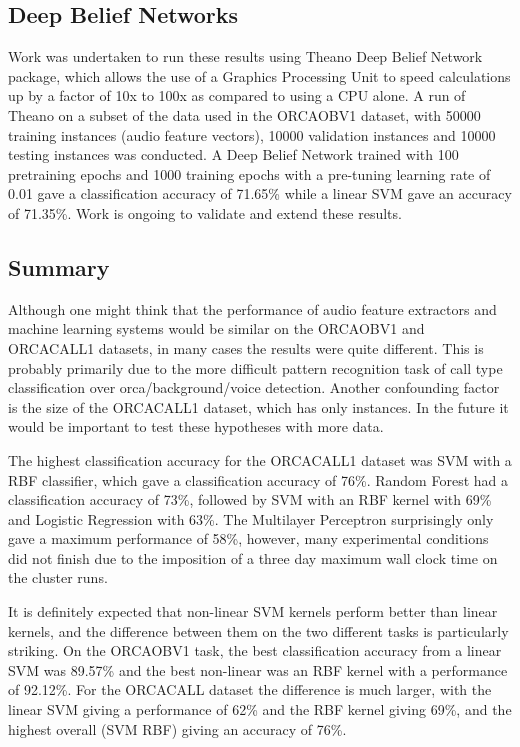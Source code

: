 \subsection{Deep Belief Networks}

Work was undertaken to run these results using Theano
\cite{bergstra2010theano} Deep Belief Network package, which allows
the use of a Graphics Processing Unit to speed calculations up by a
factor of 10x to 100x as compared to using a CPU alone.  A run of
Theano on a subset of the data used in the ORCAOBV1 dataset, with
50000 training instances (audio feature vectors), 10000 validation
instances and 10000 testing instances was conducted.  A Deep Belief
Network trained with 100 pretraining epochs and 1000 training epochs
with a pre-tuning learning rate of 0.01 gave a classification accuracy
of 71.65\% while a linear SVM gave an accuracy of 71.35\%.  Work is
ongoing to validate and extend these results.


\subsection{Summary}

Although one might think that the performance of audio feature
extractors and machine learning systems would be similar on the
ORCAOBV1 and ORCACALL1 datasets, in many cases the results were quite
different.  This is probably primarily due to the more difficult
pattern recognition task of call type classification over
orca/background/voice detection.  Another confounding factor is the
size of the ORCACALL1 dataset, which has only \totalClipsInORCACALL
instances.  In the future it would be important to test these
hypotheses with more data.

The highest classification accuracy for the ORCACALL1 dataset was SVM
with a RBF classifier, which gave a classification accuracy of 76\%.
Random Forest had a classification accuracy of 73\%, followed by SVM
with an RBF kernel with 69\% and Logistic Regression with 63\%.  The
Multilayer Perceptron surprisingly only gave a maximum performance of
58\%, however, many experimental conditions did not finish due to the
imposition of a three day maximum wall clock time on the cluster runs.

It is definitely expected that non-linear SVM kernels perform better
than linear kernels, and the difference between them on the two
different tasks is particularly striking.  On the ORCAOBV1 task, the
best classification accuracy from a linear SVM was 89.57\% and the
best non-linear was an RBF kernel with a performance of 92.12\%.  For
the ORCACALL dataset the difference is much larger, with the linear
SVM giving a performance of 62\% and the RBF kernel giving 69\%, and
the highest overall (SVM RBF) giving an accuracy of 76\%.

